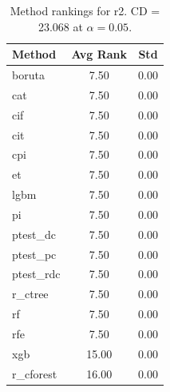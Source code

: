 \begin{table}[h]
\centering
\caption{Method rankings for r2. CD = 23.068 at $\alpha=0.05$.}
\label{tab:ranks_r2}
\begin{tabular}{lcc}
\toprule
Method & Avg Rank & Std \\
\midrule
boruta & 7.50 & 0.00 \\
cat & 7.50 & 0.00 \\
cif & 7.50 & 0.00 \\
cit & 7.50 & 0.00 \\
cpi & 7.50 & 0.00 \\
et & 7.50 & 0.00 \\
lgbm & 7.50 & 0.00 \\
pi & 7.50 & 0.00 \\
ptest_dc & 7.50 & 0.00 \\
ptest_pc & 7.50 & 0.00 \\
ptest_rdc & 7.50 & 0.00 \\
r_ctree & 7.50 & 0.00 \\
rf & 7.50 & 0.00 \\
rfe & 7.50 & 0.00 \\
xgb & 15.00 & 0.00 \\
r_cforest & 16.00 & 0.00 \\
\bottomrule
\end{tabular}
\end{table}